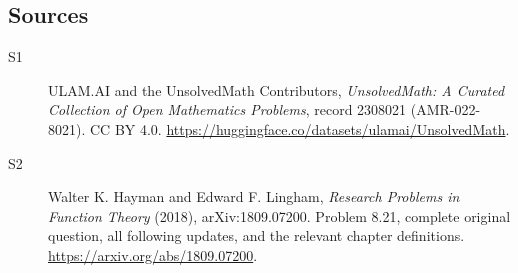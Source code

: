 \documentclass[11pt]{book}
\begin{document}
\subsection{Sources}
\begin{description}
\item[\hypertarget{source:2308021:1}{S1}] ULAM.AI and the UnsolvedMath Contributors, \emph{UnsolvedMath: A Curated Collection of Open Mathematics Problems}, record 2308021 (AMR-022-8021). CC BY 4.0. \url{https://huggingface.co/datasets/ulamai/UnsolvedMath}.
\item[\hypertarget{source:2308021:2}{S2}] Walter K. Hayman and Edward F. Lingham, \emph{Research Problems in Function Theory} (2018), arXiv:1809.07200. Problem 8.21, complete original question, all following updates, and the relevant chapter definitions. \url{https://arxiv.org/abs/1809.07200}.
\end{description}
\label{end:2308021}
\end{document}
